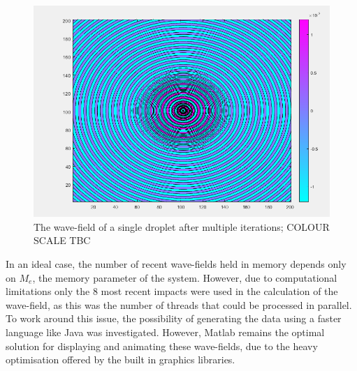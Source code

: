 \begin{figure}
\centering
\includegraphics[width=\textwidth]{simulation/matlab.png}
\caption{The wave-field of a single droplet after multiple iterations; COLOUR SCALE TBC}
\label{fig:matlabMaths}
\end{figure}

In an ideal case, the number of recent wave-fields held in memory depends only on $M_e$, the memory parameter of the system. However, due to computational limitations only the 8 most recent impacts were used in the calculation of the wave-field, as this was the number of threads that could be processed in parallel. To work around this issue, the possibility of generating the data using a faster language like Java was investigated. However, Matlab remains the optimal solution for displaying and animating these wave-fields, due to the heavy optimisation offered by the built in graphics libraries.


